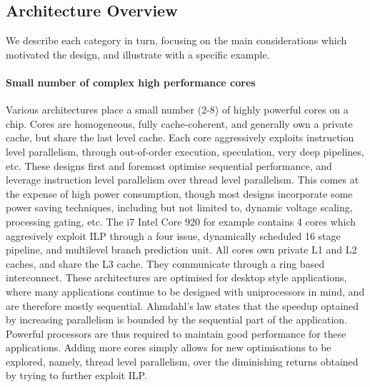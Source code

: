 \subsection{Architecture Overview}

We describe each category in turn, focusing on the main 
considerations which motivated the design, and illustrate
with a specific example.

\paragraph{Small number of complex high performance cores}
Various architectures place a small number (2-8) of highly
powerful cores on a chip.  Cores are homogeneous, fully cache-coherent,
and generally own a private cache, but share the last level cache. 
Each core aggressively exploits instruction level parallelism, through
out-of-order execution, speculation, very deep pipelines, etc. 
These designs first and foremost optimise sequential performance, 
and leverage instruction level parallelism over thread level parallelism. 
This comes at the expense of high power consumption, 
though most designs incorporate some power
saving techniques, including but not limited to, dynamic 
voltage scaling, processing gating, etc.
The i7 Intel Core 920 for example contains 4 cores which aggresively
exploit ILP through a four issue,  dynamically scheduled 16 stage pipeline,
and multilevel branch prediction unit. All cores own
 private L1 and L2 caches, and share the L3 cache. They communicate
through a ring based interconnect. These architectures are
optimised for desktop style applications, where many applications continue
to be designed with uniprocessors in mind, and are therefore mostly sequential.
Ahmdahl's law states that the speedup optained by increasing parallelism 
is bounded by the sequential part of the application. Powerful processors are 
thus required to maintain good performance for these applications. 
Adding more cores simply allows for new optimisations to be explored, namely, 
thread level parallelism, over the diminishing returns obtained by trying
to further exploit ILP. 


